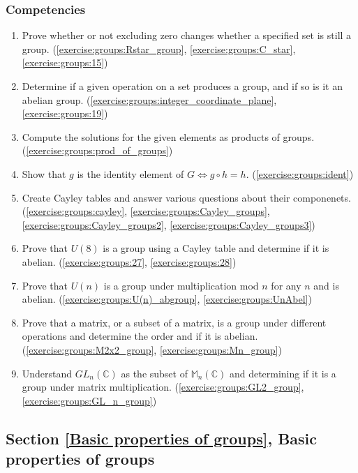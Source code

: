 \subsubsection*{Competencies}
\begin{enumerate}
\item
Prove whether or not excluding zero changes whether a specified set is still a group. (\ref{exercise:groups:Rstar_group}, \ref{exercise:groups:C_star}, \ref{exercise:groups:15})
\item
Determine if a given operation on a set produces a group, and if so is it an abelian group. (\ref{exercise:groups:integer_coordinate_plane}, \ref{exercise:groups:19})
\item
Compute the solutions for the given elements as products of groups. (\ref{exercise:groups:prod_of_groups})
\item
Show that $g$ is the identity element of $G \iff g \circ h = h$. (\ref{exercise:groups:ident})
\item
Create Cayley tables and answer various questions about their componenets. (\ref{exercise:groups:cayley}, \ref{exercise:groups:Cayley_groups}, \ref{exercise:groups:Cayley_groups2}, \ref{exercise:groups:Cayley_groups3})
\item
Prove that $U(8)$ is a group using a Cayley table and determine if it is abelian. (\ref{exercise:groups:27}, \ref{exercise:groups:28})
\item
Prove that $U(n)$ is a group under multiplication mod $n$ for any $n$ and is abelian. (\ref{exercise:groups:U(n)_abgroup}, \ref{exercise:groups:UnAbel})
\item
Prove that a matrix, or a subset of a matrix,  is a group under different operations and determine the order and if it is abelian. (\ref{exercise:groups:M2x2_group}, \ref{exercise:groups:Mn_group})
\item
Understand $GL_n({\mathbb C})$ as the subset of ${\mathbb M}_n({\mathbb C})$ and determining if it is a group under matrix multiplication. (\ref{exercise:groups:GL2_group}, \ref{exercise:groups:GL_n_group})
\end{enumerate}


\subsection*{Section \ref{Basic properties of groups}, Basic properties of groups}
